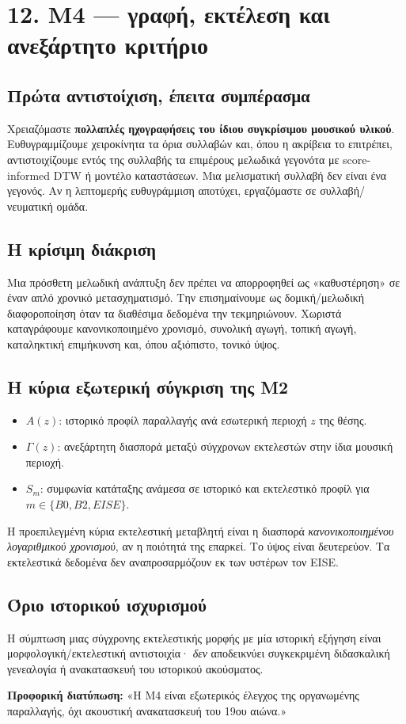 \documentclass[9pt,a4paper]{extarticle}
\newcommand{\say}[1]{\begin{keybox}\textbf{Προφορική διατύπωση:} #1\end{keybox}}
\begin{document}
\section*{12. M4 — γραφή, εκτέλεση και ανεξάρτητο κριτήριο}
\subsection*{Πρώτα αντιστοίχιση, έπειτα συμπέρασμα}
Χρειαζόμαστε \textbf{πολλαπλές ηχογραφήσεις του ίδιου συγκρίσιμου μουσικού υλικού}. Ευθυγραμμίζουμε χειροκίνητα τα όρια συλλαβών και, όπου η ακρίβεια το επιτρέπει, αντιστοιχίζουμε εντός της συλλαβής τα επιμέρους μελωδικά γεγονότα με score-informed DTW ή μοντέλο καταστάσεων. Μια μελισματική συλλαβή δεν είναι ένα γεγονός. Αν η λεπτομερής ευθυγράμμιση αποτύχει, εργαζόμαστε σε συλλαβή/νευματική ομάδα.
\subsection*{Η κρίσιμη διάκριση}
Μια πρόσθετη μελωδική ανάπτυξη δεν πρέπει να απορροφηθεί ως «καθυστέρηση» σε έναν απλό χρονικό μετασχηματισμό. Την επισημαίνουμε ως δομική/μελωδική διαφοροποίηση όταν τα διαθέσιμα δεδομένα την τεκμηριώνουν. Χωριστά καταγράφουμε κανονικοποιημένο χρονισμό, συνολική αγωγή, τοπική αγωγή, καταληκτική επιμήκυνση και, όπου αξιόπιστο, τονικό ύψος.
\subsection*{Η κύρια εξωτερική σύγκριση της M2}
\begin{itemize}
\item \(A(z)\): ιστορικό προφίλ παραλλαγής ανά εσωτερική περιοχή \(z\) της θέσης.
\item \(\Gamma(z)\): ανεξάρτητη διασπορά μεταξύ σύγχρονων εκτελεστών στην ίδια μουσική περιοχή.
\item \(S_m\): συμφωνία κατάταξης ανάμεσα σε ιστορικό και εκτελεστικό προφίλ για \(m\in\{B0,B2,EISE\}\).
\end{itemize}
Η προεπιλεγμένη κύρια εκτελεστική μεταβλητή είναι η διασπορά \emph{κανονικοποιημένου λογαριθμικού χρονισμού}, αν η ποιότητά της επαρκεί. Το ύψος είναι δευτερεύον. Τα εκτελεστικά δεδομένα δεν αναπροσαρμόζουν εκ των υστέρων τον EISE.
\subsection*{Όριο ιστορικού ισχυρισμού}
Η σύμπτωση μιας σύγχρονης εκτελεστικής μορφής με μία ιστορική εξήγηση είναι μορφολογική/εκτελεστική αντιστοιχία· \emph{δεν} αποδεικνύει συγκεκριμένη διδασκαλική γενεαλογία ή ανακατασκευή του ιστορικού ακούσματος.
\say{«Η M4 είναι εξωτερικός έλεγχος της οργανωμένης παραλλαγής, όχι ακουστική ανακατασκευή του 19ου αιώνα.»}
\newpage
\end{document}
